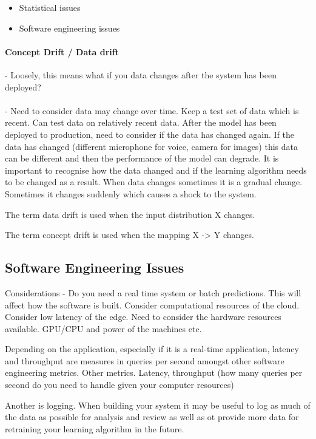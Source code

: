 \begin{itemize}
    \item Statistical issues
    \item Software engineering issues
\end{itemize}

\paragraph{Concept Drift / Data drift} - Loosely, this means what if you data changes after the system has been deployed?

\paragraph{} - Need to consider data may change over time.
Keep a test set of data which is recent.
Can test data on relatively recent data.
After the model has been deployed to production, need to consider if the data has changed again.
If the data has changed (different microphone for voice, camera for images)  this data can be different and then the performance of the model can degrade.
It is important to recognise how the data changed and if the learning algorithm needs to be changed as a result.
When data changes sometimes it is a gradual change.
Sometimes it changes suddenly which causes a shock to the system.

The term data drift is used when the input distribution X changes.

The term concept drift is used when the mapping X -> Y changes.

\subsection{Software Engineering Issues}

Considerations - Do you need a real time system or batch predictions.
This will affect how the software is built.
Consider computational resources of the cloud.
Consider low latency of the edge.
Need to consider the hardware resources available.
GPU/CPU and power of the machines etc.

Depending on the application, especially if it is a real-time application, latency and throughput are measures in queries per second amongst other software engineering metrics.
Other metrics.
Latency, throughput (how many queries per second do you need to handle given your computer resources)

Another is logging.
When building your system it may be useful to log as much of the data as possible for analysis and review as well as ot provide more data for retraining your learning algorithm in the future.

